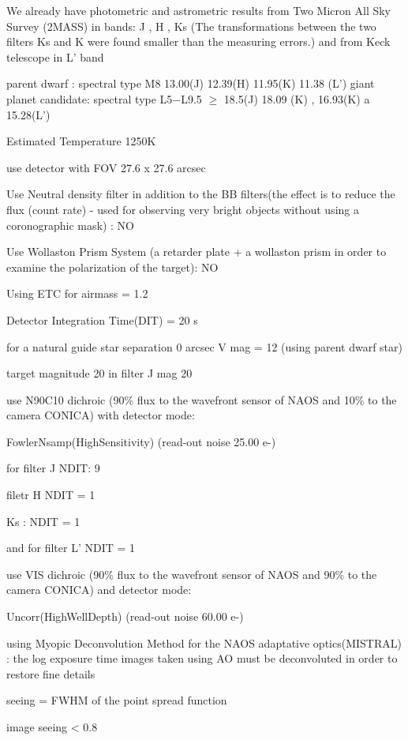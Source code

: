 \documentclass[12pt,a4paper]{article}  %
\begin{document}
We already have photometric and astrometric results  from Two Micron All Sky Survey (2MASS) in bands: J , H , Ks 
(The transformations between the two filters Ks and K were found smaller than the measuring errors.) and from Keck telescope in L' band 

parent dwarf : spectral type M8  13.00(J) 12.39(H) 11.95(K) 11.38 (L') 
giant planet candidate: spectral type L5−L9.5 $\ge$ 18.5(J)  18.09 (K) , 16.93(K) a 15.28(L') 


Estimated Temperature 1250K 




use detector with FOV 27.6 x 27.6 arcsec

Use Neutral density filter in addition to the BB filters(the effect is to reduce the flux (count rate) - used for observing very bright objects without using a coronographic mask) : NO

Use Wollaston Prism System (a retarder plate + a wollaston prism in order to examine the polarization of the target): NO



Using ETC for airmass = 1.2 

Detector Integration Time(DIT) = 20 s

for a natural guide star separation 0 arcsec  V mag = 12  (using parent dwarf star)

target magnitude 20 in filter J mag 20  

use N90C10 dichroic (90\% flux to the wavefront sensor  of NAOS and 10\% to the camera CONICA) with detector mode:

FowlerNsamp(HighSensitivity) (read-out noise 25.00 e-)

for filter J   NDIT: 9  

filetr H NDIT = 1

Ks : NDIT = 1

and  for filter L' NDIT = 1 

use VIS dichroic (90\% flux to the wavefront sensor  of NAOS and 90\% to the camera CONICA) and  detector mode:

Uncorr(HighWellDepth) (read-out noise 60.00 e-)



using Myopic Deconvolution Method for the NAOS adaptative optics(MISTRAL) : the log exposure time images taken using AO must be deconvoluted in order to restore fine details

seeing = FWHM of the point spread function 

image seeing < 0.8
\end{document}
